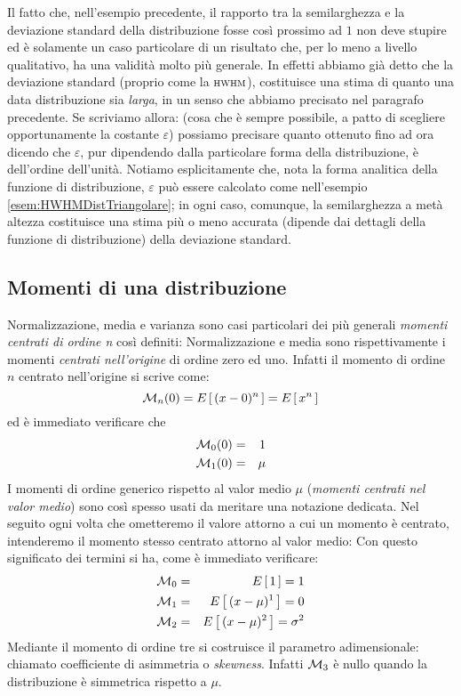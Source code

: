 \noindent Il fatto che, nell'esempio precedente, il rapporto tra la
semilarghezza e la deviazione standard della distribuzione fosse cos\`i
prossimo ad $1$ non deve stupire ed \`e solamente un caso particolare
di un risultato che, per lo meno a livello qualitativo,
ha una validit\`a molto pi\`u generale.
In effetti abbiamo gi\`a detto che la deviazione standard (proprio
come la ${\scriptstyle \textsc{HWHM}}$), costituisce una stima di quanto una data distribuzione sia
\emph{larga}, in un senso che abbiamo precisato nel paragrafo precedente.
Se scriviamo allora:
\eqn{
\hwhm = \varepsilon \sigma
}
(cosa che \`e sempre possibile, a patto di scegliere opportunamente la costante
$\varepsilon$) possiamo precisare quanto ottenuto fino ad ora dicendo che
$\varepsilon$, pur dipendendo dalla particolare forma della distribuzione,
\`e dell'ordine dell'unit\`a. Notiamo esplicitamente che, nota la forma
analitica della funzione di distribuzione, $\varepsilon$ pu\`o essere
calcolato come nell'esempio \ref{esem:HWHMDistTriangolare}; in ogni caso,
comunque, la semilarghezza a met\`a altezza costituisce una stima pi\`u o
meno accurata (dipende dai dettagli della funzione di distribuzione) della
deviazione standard.


\subsection{Momenti di una distribuzione}
Normalizzazione, media e varianza sono casi particolari dei pi\`u
generali {\itshape momenti centrati di ordine n} cos\`i definiti:
Normalizzazione e media sono rispettivamente i momenti {\itshape centrati
nell'origine} di ordine zero ed uno. Infatti il momento di ordine $n$
centrato nell'origine si scrive come:
$$
\displaystyle {\cal M}_{n}(0) = \displaystyle E\left[\, (x - 0)^n \, \right] = \displaystyle E\left[\, x^n \, \right]
$$
ed \`e immediato verificare che
\begin{eqnarray*}
\displaystyle {\cal M}_{0}(0) & = & 1\\
\displaystyle {\cal M}_{1}(0) & = & \mu
\end{eqnarray*}
I momenti di ordine generico rispetto al valor medio $\mu$ ({\itshape momenti
centrati nel valor medio}) sono cos\`i spesso usati da meritare una notazione
dedicata. Nel seguito ogni volta che ometteremo il valore attorno a cui
un momento \`e centrato, intenderemo il momento stesso centrato attorno
al valor medio:
Con questo significato dei termini si ha, come \`e immediato verificare:
\begin{eqnarray*}
\displaystyle {\cal M}_{0} & = & \displaystyle E\left[\, 1 \, \right] = 1\\
\displaystyle {\cal M}_{1} & = & \displaystyle E\left[\, (x - \mu)^1 \, \right] = 0\\
\displaystyle {\cal M}_{2} & = & \displaystyle E\left[\, (x - \mu)^2 \, \right] = \sigma^2
\end{eqnarray*}
Mediante il momento di ordine tre si costruisce il parametro
adimensionale:
chiamato coefficiente di asimmetria o {\itshape skewness}.
Infatti $\displaystyle {\cal M}_{3}$ \`e nullo quando la distribuzione \`e simmetrica
rispetto a $\mu$.

